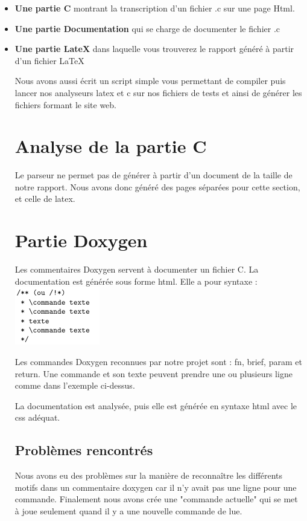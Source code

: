 \documentclass[10pt,a4paper]{report}
\begin{document}
\begin{itemize}
\item {\bf Une partie C} montrant la transcription d'un fichier .c sur une page Html.
\item {\bf Une partie Documentation} qui se charge de documenter le fichier .c
\item {\bf Une partie LateX} dans laquelle vous trouverez le rapport généré à partir d'un fichier LaTeX

Nous avons aussi écrit un script simple vous permettant de compiler puis lancer nos analyseurs latex et c sur nos fichiers de tests et ainsi de générer les fichiers formant le site web. \\

\section{Analyse de la partie C}

Le parseur ne permet pas de générer à partir d'un document de la taille de notre rapport. Nous avons donc généré des pages séparées pour cette section, et celle de latex.

\section{Partie Doxygen}

Les commentaires Doxygen servent à documenter un fichier C. La documentation est générée sous forme html. Elle a pour syntaxe :
\newline
\includegraphics{code1.png}

Les commandes Doxygen reconnues par notre projet sont : fn, brief, param et return. Une commande et son texte peuvent prendre une ou plusieurs ligne comme dans l'exemple ci-dessus.

La documentation est analysée, puis elle est générée en syntaxe html avec le css adéquat.

\subsection{Problèmes rencontrés}
Nous avons eu des problèmes sur la manière de reconnaître les différents motifs dans un commentaire doxygen car il n'y avait pas une ligne pour une commande. Finalement nous avons crée une "commande actuelle" qui se met à joue seulement quand il y a une nouvelle commande de lue.



\end{itemize}
\end{document}
